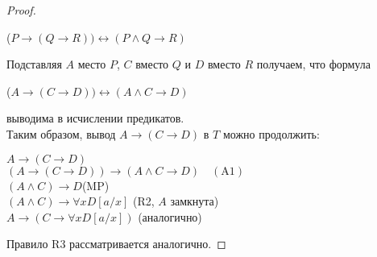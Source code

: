 \begin{proof}
\begin{center}
		($P \rightarrow(Q\rightarrow R))\leftrightarrow (P\wedge Q\rightarrow R)$
	\end{center}
	Подставляя $A$ место $P$, $C$ вместо $Q$ и $D$ вместо $R$ получаем, что формула
	\begin{center}
		($A \rightarrow(C\rightarrow D))\leftrightarrow (A\wedge C\rightarrow D)$
	\end{center}
	выводима в исчислении предикатов.\\
	Таким образом, вывод $A \rightarrow(C\rightarrow D)$ в $T$ можно продолжить:
	\begin{center}
		$A \rightarrow(C \rightarrow D)$\\
		$(A \rightarrow(C \rightarrow D)) \rightarrow(A \wedge C \rightarrow D) \quad(\mathrm{A} 1)$\\
		$(A \wedge C) \rightarrow D$(MP)\\
		$(A \wedge C) \rightarrow \forall x D[a / x]$ (R2, $A$ замкнута)\\ $A \rightarrow(C \rightarrow \forall x D[a / x])$ (аналогично)
	\end{center}
	Правило R3 рассматривается аналогично.
\end{proof}
